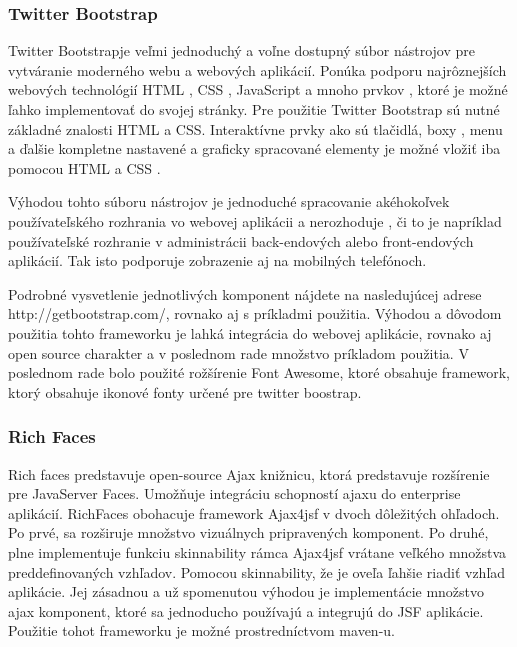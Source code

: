 \subsubsection{Twitter Bootstrap}
Twitter Bootstrapje veľmi jednoduchý a voľne dostupný súbor nástrojov pre vytváranie moderného webu a webových aplikácií.\cite{boot} Ponúka podporu najrôznejších webových technológií HTML , CSS , JavaScript a mnoho prvkov , ktoré je možné ľahko implementovať do svojej stránky. Pre použitie Twitter Bootstrap sú nutné základné znalosti HTML a CSS. Interaktívne prvky ako sú tlačidlá, boxy , menu a ďalšie kompletne nastavené a graficky spracované elementy je možné vložiť iba pomocou HTML a CSS .

Výhodou tohto súboru nástrojov je jednoduché spracovanie akéhokoľvek používateľského rozhrania vo webovej aplikácii a nerozhoduje , či to je napríklad používateľské rozhranie v administrácii back-endových alebo front-endových aplikácií. Tak isto podporuje zobrazenie aj na mobilných telefónoch.


Podrobné vysvetlenie jednotlivých komponent nájdete na nasledujúcej adrese http://getbootstrap.com/, rovnako aj s príkladmi použitia. Výhodou a dôvodom použitia tohto frameworku je lahká integrácia do webovej aplikácie, rovnako aj open source charakter a v poslednom rade množstvo príkladom použitia. V poslednom rade bolo použité rožšírenie Font Awesome, ktoré obsahuje framework, ktorý obsahuje ikonové fonty určené pre twitter boostrap.


\subsubsection{Rich Faces}
Rich faces predstavuje open-source Ajax knižnicu, ktorá predstavuje rozšírenie pre JavaServer Faces. Umožňuje integráciu schopností ajaxu do enterprise aplikácií. RichFaces obohacuje framework Ajax4jsf v dvoch dôležitých ohľadoch. Po prvé, sa rozširuje množstvo vizuálnych pripravených komponent. Po druhé,  plne implementuje funkciu skinnability rámca Ajax4jsf vrátane veľkého množstva preddefinovaných vzhľadov. Pomocou skinnability, že je oveľa ľahšie riadiť vzhľad aplikácie. Jej zásadnou a už spomenutou výhodou je implementácie množstvo ajax komponent, ktoré sa jednoducho používajú a integrujú do JSF aplikácie. Použitie tohot frameworku je možné prostredníctvom maven-u.





